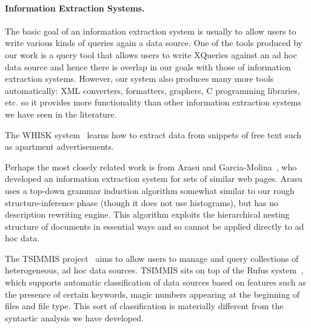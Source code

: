 \paragraph*{Information Extraction Systems.}
The basic goal of an information extraction system is usually
to allow users to write various kinds of queries again a data source.
One of the tools produced by our work
is a query tool that allows users to write XQueries against an
ad hoc data source and hence there is overlap in our goals with
those of information extraction systems.  However, our system 
also produces many more tools automatically: XML converters, formatters,
graphers, C programming libraries, etc. so it provides more functionality
than other information extraction systems we have seen in the literature.

The WHISK system~\cite{soderland:whisk} learns how to extract data
from snippets of free text such as apartment advertisements.

Perhaps the most closely related work is from Arasu and 
Garcia-Molina~\cite{arasu+:sigmod03}, who developed an information
extraction system for sets of similar web pages.  
Arasu uses a top-down grammar induction
algorithm somewhat similar to our rough structure-inference phase
(though it does not use histograms),
but has no description rewriting engine.  
This algorithm exploits the hierarchical nesting
structure of \xml{} documents in essential ways
and so cannot be applied directly to ad hoc data.  

The TSIMMIS project~\cite{chawathe+:tsimmis} aims to
allow users to manage and query collections of heterogeneous, ad hoc
data sources.  TSIMMIS sits on top of the Rufus
system~\cite{shoens+:rufus}, which supports automatic classification
of data sources based on features such as the presence of certain
keywords, magic numbers appearing at the beginning of files and file
type.  
This sort of classification is materially
different from the syntactic analysis we have developed.

